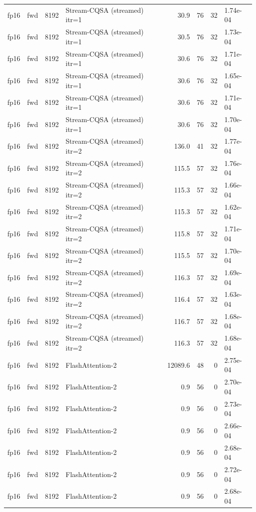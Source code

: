 \begin{tabular}{llrlrrrl}
fp16 & fwd & 8192 & Stream-CQSA (streamed) itr=1 & 30.9 & 76 & 32 & 1.74e-04 \\
fp16 & fwd & 8192 & Stream-CQSA (streamed) itr=1 & 30.5 & 76 & 32 & 1.73e-04 \\
fp16 & fwd & 8192 & Stream-CQSA (streamed) itr=1 & 30.6 & 76 & 32 & 1.71e-04 \\
fp16 & fwd & 8192 & Stream-CQSA (streamed) itr=1 & 30.6 & 76 & 32 & 1.65e-04 \\
fp16 & fwd & 8192 & Stream-CQSA (streamed) itr=1 & 30.6 & 76 & 32 & 1.71e-04 \\
fp16 & fwd & 8192 & Stream-CQSA (streamed) itr=1 & 30.6 & 76 & 32 & 1.70e-04 \\
fp16 & fwd & 8192 & Stream-CQSA (streamed) itr=2 & 136.0 & 41 & 32 & 1.77e-04 \\
fp16 & fwd & 8192 & Stream-CQSA (streamed) itr=2 & 115.5 & 57 & 32 & 1.76e-04 \\
fp16 & fwd & 8192 & Stream-CQSA (streamed) itr=2 & 115.3 & 57 & 32 & 1.66e-04 \\
fp16 & fwd & 8192 & Stream-CQSA (streamed) itr=2 & 115.3 & 57 & 32 & 1.62e-04 \\
fp16 & fwd & 8192 & Stream-CQSA (streamed) itr=2 & 115.8 & 57 & 32 & 1.71e-04 \\
fp16 & fwd & 8192 & Stream-CQSA (streamed) itr=2 & 115.5 & 57 & 32 & 1.70e-04 \\
fp16 & fwd & 8192 & Stream-CQSA (streamed) itr=2 & 116.3 & 57 & 32 & 1.69e-04 \\
fp16 & fwd & 8192 & Stream-CQSA (streamed) itr=2 & 116.4 & 57 & 32 & 1.63e-04 \\
fp16 & fwd & 8192 & Stream-CQSA (streamed) itr=2 & 116.7 & 57 & 32 & 1.68e-04 \\
fp16 & fwd & 8192 & Stream-CQSA (streamed) itr=2 & 116.3 & 57 & 32 & 1.68e-04 \\
fp16 & fwd & 8192 & FlashAttention-2 & 12089.6 & 48 & 0 & 2.75e-04 \\
fp16 & fwd & 8192 & FlashAttention-2 & 0.9 & 56 & 0 & 2.70e-04 \\
fp16 & fwd & 8192 & FlashAttention-2 & 0.9 & 56 & 0 & 2.73e-04 \\
fp16 & fwd & 8192 & FlashAttention-2 & 0.9 & 56 & 0 & 2.66e-04 \\
fp16 & fwd & 8192 & FlashAttention-2 & 0.9 & 56 & 0 & 2.68e-04 \\
fp16 & fwd & 8192 & FlashAttention-2 & 0.9 & 56 & 0 & 2.72e-04 \\
fp16 & fwd & 8192 & FlashAttention-2 & 0.9 & 56 & 0 & 2.68e-04 \\

\end{tabular}
